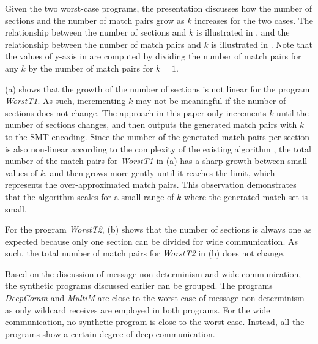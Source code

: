 Given the two worst-case programs, the presentation discusses how the number of sections and the number of match pairs grow as $k$ increases for the two cases. 
The relationship between the number of sections and $k$ is illustrated in , and the relationship between the number of match pairs and $k$ is illustrated in .
Note that the values of y-axis in  are computed by dividing the number of match pairs for any $k$ by the number of match pairs for $k=1$.

 (a) shows that the growth of the number of sections is not linear for the program \textit{WorstT1}. As such, incrementing $k$ may not be meaningful if the number of sections does not change. The approach in this paper only increments $k$ until the number of sections changes, and then outputs the generated match pairs with $k$ to the SMT encoding.
Since the number of the generated match pairs per section is also non-linear according to the complexity of the existing algorithm \cite{DBLP:conf/kbse/HuangMM13}, the total number of the match pairs for \textit{WorstT1} in  (a) has a sharp growth between small values of $k$, and then grows more gently until it reaches the limit, which represents the over-approximated match pairs. This observation demonstrates that the algorithm scales for a small range of $k$ where the generated match set is small.


For the program \textit{WorstT2},  (b) shows that the number of sections is always one as expected because only one section can be divided for wide communication. 
As such, the total number of match pairs for \textit{WorstT2} in  (b) does not change. 

Based on the discussion of message non-determinism and wide communication, the synthetic programs discussed earlier can be grouped. The programs \textit{DeepComm} and \textit{MultiM} are close to the worst case of message non-determinism as only wildcard receives are employed in both programs. For the wide communication, no synthetic program is close to the worst case. Instead, all the programs show a certain degree of deep communication. 

